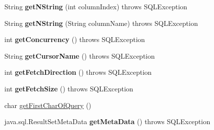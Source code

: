 \begin{DoxyCompactItemize}
String {\bfseries get\+N\+String} (int column\+Index)  throws S\+Q\+L\+Exception 
\item 
\mbox{\label{classcom_1_1mysql_1_1cj_1_1jdbc_1_1result_1_1_result_set_impl_a1ba791221fdb9fdb3205ff4a03513c8a}} 
String {\bfseries get\+N\+String} (String column\+Name)  throws S\+Q\+L\+Exception 
\item 
\mbox{\label{classcom_1_1mysql_1_1cj_1_1jdbc_1_1result_1_1_result_set_impl_ab61f970f529c650b387801c7b5564a04}} 
int {\bfseries get\+Concurrency} ()  throws S\+Q\+L\+Exception 
\item 
\mbox{\label{classcom_1_1mysql_1_1cj_1_1jdbc_1_1result_1_1_result_set_impl_ae9a387debe813452e883eaad4380fbfa}} 
String {\bfseries get\+Cursor\+Name} ()  throws S\+Q\+L\+Exception 
\item 
\mbox{\label{classcom_1_1mysql_1_1cj_1_1jdbc_1_1result_1_1_result_set_impl_a78439a9f748a97fbf055e26fc73b8d13}} 
int {\bfseries get\+Fetch\+Direction} ()  throws S\+Q\+L\+Exception 
\item 
\mbox{\label{classcom_1_1mysql_1_1cj_1_1jdbc_1_1result_1_1_result_set_impl_a1369ad7032b0cb985abbaf9db0f21b6d}} 
int {\bfseries get\+Fetch\+Size} ()  throws S\+Q\+L\+Exception 
\item 
char \mbox{\hyperlink{classcom_1_1mysql_1_1cj_1_1jdbc_1_1result_1_1_result_set_impl_aa660f8429c96f057e5c3046f32a06a18}{get\+First\+Char\+Of\+Query}} ()
\item 
\mbox{\label{classcom_1_1mysql_1_1cj_1_1jdbc_1_1result_1_1_result_set_impl_a5dfbd232f08f23825a1d665009b1070a}} 
java.\+sql.\+Result\+Set\+Meta\+Data {\bfseries get\+Meta\+Data} ()  throws S\+Q\+L\+Exception 
\item 
\mbox{\label{classcom_1_1mysql_1_1cj_1_1jdbc_1_1result_1_1_result_set_impl_a4edc602009874dca9e0ff1956053e74f}} 

\end{DoxyCompactItemize}
